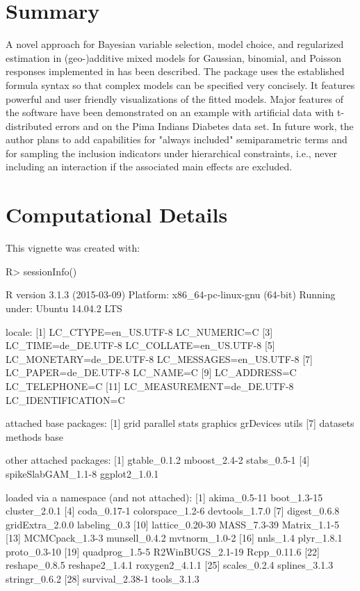 \documentclass[article, shortnames, nojss, noheadings, notitle]{jss}
\begin{document}
\section{Summary}
A novel approach for Bayesian variable selection, model choice, and regularized estimation in
(geo-)additive mixed models for Gaussian, binomial, and Poisson responses implemented in  has been described.
The package uses the established  formula syntax so that complex models can be specified very concisely.
It features powerful and user friendly visualizations of the fitted models.
Major features of the software have been demonstrated on an example with artificial data with t-distributed errors
and on the Pima Indians Diabetes data set.
In future work, the author plans to add capabilities for "always included" semiparametric terms and for
sampling the inclusion indicators under hierarchical constraints,
i.e., never including an interaction if the associated main effects are excluded.

\newpage

\section*{Computational Details}
This vignette was created with:
\begin{Schunk}
\begin{Sinput}
R> 	sessionInfo()
\end{Sinput}
\begin{Soutput}
R version 3.1.3 (2015-03-09)
Platform: x86_64-pc-linux-gnu (64-bit)
Running under: Ubuntu 14.04.2 LTS

locale:
 [1] LC_CTYPE=en_US.UTF-8       LC_NUMERIC=C              
 [3] LC_TIME=de_DE.UTF-8        LC_COLLATE=en_US.UTF-8    
 [5] LC_MONETARY=de_DE.UTF-8    LC_MESSAGES=en_US.UTF-8   
 [7] LC_PAPER=de_DE.UTF-8       LC_NAME=C                 
 [9] LC_ADDRESS=C               LC_TELEPHONE=C            
[11] LC_MEASUREMENT=de_DE.UTF-8 LC_IDENTIFICATION=C       

attached base packages:
[1] grid      parallel  stats     graphics  grDevices utils    
[7] datasets  methods   base     

other attached packages:
[1] gtable_0.1.2       mboost_2.4-2       stabs_0.5-1       
[4] spikeSlabGAM_1.1-8 ggplot2_1.0.1     

loaded via a namespace (and not attached):
 [1] akima_0.5-11     boot_1.3-15      cluster_2.0.1   
 [4] coda_0.17-1      colorspace_1.2-6 devtools_1.7.0  
 [7] digest_0.6.8     gridExtra_2.0.0  labeling_0.3    
[10] lattice_0.20-30  MASS_7.3-39      Matrix_1.1-5    
[13] MCMCpack_1.3-3   munsell_0.4.2    mvtnorm_1.0-2   
[16] nnls_1.4         plyr_1.8.1       proto_0.3-10    
[19] quadprog_1.5-5   R2WinBUGS_2.1-19 Rcpp_0.11.6     
[22] reshape_0.8.5    reshape2_1.4.1   roxygen2_4.1.1  
[25] scales_0.2.4     splines_3.1.3    stringr_0.6.2   
[28] survival_2.38-1  tools_3.1.3     
\end{Soutput}
\end{Schunk}
\end{document}
